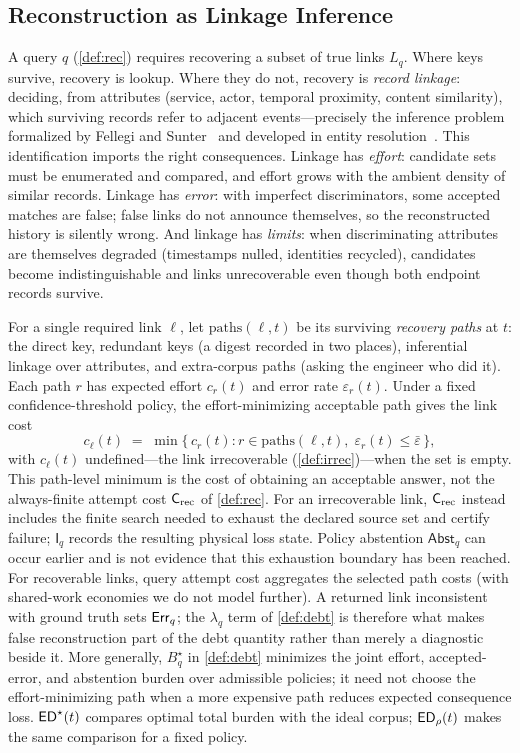 \subsection{Reconstruction as Linkage Inference}
\label{sec:model-linkage}

A query $q$ (\cref{def:rec}) requires recovering a subset of true links $L_q$. Where
keys survive, recovery is lookup. Where they do not, recovery is \emph{record
linkage}: deciding, from attributes (service, actor, temporal proximity, content
similarity), which surviving records refer to adjacent events---precisely the
inference problem formalized by Fellegi and Sunter~\cite{fellegi1969} and developed
in entity resolution~\cite{christen2012}. This identification imports the right
consequences. Linkage has \emph{effort}: candidate sets must be enumerated and
compared, and effort grows with the ambient density of similar records. Linkage has
\emph{error}: with imperfect discriminators, some accepted matches are false; false
links do not announce themselves, so the reconstructed history is silently wrong.
And linkage has \emph{limits}: when discriminating attributes are themselves
degraded (timestamps nulled, identities recycled), candidates become
indistinguishable and links unrecoverable even though both endpoint records
survive.

For a single required link $\ell$, let $\mathrm{paths}(\ell, t)$ be its surviving
\emph{recovery paths} at $t$: the direct key, redundant keys (a digest recorded in
two places), inferential linkage over attributes, and extra-corpus paths (asking the
engineer who did it). Each path $r$ has expected effort $c_r(t)$ and error rate
$\varepsilon_r(t)$. Under a fixed confidence-threshold policy, the effort-minimizing
acceptable path gives the link cost
\[
c_\ell(t) \;=\; \min \{\, c_r(t) : r \in \mathrm{paths}(\ell, t),\;
\varepsilon_r(t) \le \bar{\varepsilon} \,\},
\]
with $c_\ell(t)$ undefined---the link irrecoverable (\cref{def:irrec})---when the
set is empty. This path-level minimum is the cost of obtaining an acceptable answer,
not the always-finite attempt cost $\mathsf{C}_{\mathrm{rec}}$ of \cref{def:rec}. For an irrecoverable
link, $\mathsf{C}_{\mathrm{rec}}$ instead includes the finite search needed to exhaust the declared source
set and certify failure; $\mathsf I_q$ records the resulting physical loss state.
Policy abstention $\mathsf{Abst}_q$ can occur earlier and is not evidence that this
exhaustion boundary has been reached. For recoverable
links, query attempt cost aggregates the selected path costs (with shared-work
economies we do not model further). A returned link inconsistent with ground truth
sets $\mathsf{Err}_q$; the $\lambda_q$ term of \cref{def:debt} is therefore what makes
false reconstruction part of the debt quantity rather than merely a diagnostic
beside it. More generally, $B_q^{\star}$ in \cref{def:debt} minimizes the joint
effort, accepted-error, and abstention burden over admissible policies; it need
not choose the effort-minimizing path when a more expensive path reduces expected
consequence loss. $\mathsf{ED}^{\star}(t)$ compares optimal total burden with the ideal
corpus; $\mathsf{ED}_\rho(t)$ makes the same comparison for a fixed policy.


